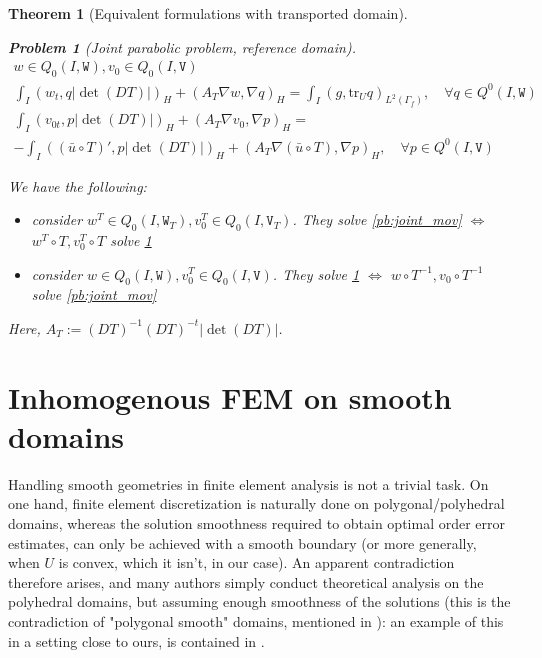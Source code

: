 \documentclass[english,a4paper,9pt,oneside]{scrbook}	%
\theoremstyle{break}
\newtheorem{thm}[equation]{Theorem}
\newtheorem{pb}[equation]{Problem}
\theoremstyle{remark}
\newcommand{\tr}{\text{tr}}
\newcommand{\tw}[1]{\texttt{#1}}
\begin{document}
\begin{appendices}
\begin{thm}[Equivalent formulations with transported domain]
\begin{pb}[Joint parabolic problem, reference domain]
\label{pb:joint_ref}
\begin{align*}
w \in Q_0(I, \tw{W}), v_0 \in Q_0(I,\tw{V}) \\
\int_I ( w_t , q |\det(DT)|)_H+ (A_T\nabla w, \nabla q)_{H} =\int_I(g,\tr_{U} q)_{L^2(\Gamma_f)}, \quad \forall q \in Q^0(I, \tw{W}) \\
\int_I ( v_{0t},p |\det(DT)|)_H + (A_T \nabla v_0, \nabla p)_{H}=\\ -\int_I((\bar{u}\circ T)',p|\det(DT)|)_{H}+(A_T \nabla (\bar{u} \circ T), \nabla p)_{H}, \quad \forall p \in Q^0(I, \tw{V})
\end{align*}
\end{pb}

We have the following:

\begin{itemize}
	\item consider $w^T \in Q_0(I, \tw{W}_T), v_0^T \in Q_0(I,\tw{V}_T)$. They solve \cref{pb:joint_mov} $\iff$ $w^T\circ T , v_0^T\circ T $ solve \cref{pb:joint_ref}
	\item consider $w \in Q_0(I, \tw{W}), v_0^T \in Q_0(I,\tw{V})$. They solve \cref{pb:joint_ref} $\iff$ $w\circ T^{-1}, v_0\circ T^{-1}$ solve \cref{pb:joint_mov} 

\end{itemize}

Here, $A_T:=  (DT)^{-1}(DT)^{-t}|\det(DT)|$.

\end{thm}

\chapter{Inhomogenous FEM on smooth domains}
\label{chap:inh_fem}
Handling smooth geometries in finite element analysis is not a trivial task. On one hand, finite element discretization is naturally done on polygonal/polyhedral domains, whereas the solution smoothness required to obtain optimal order error estimates, can only be achieved with a smooth boundary (or more generally, when $U$ is convex, which it isn't, in our case). An apparent contradiction therefore arises, and many authors simply conduct theoretical analysis on the polyhedral domains, but assuming enough smoothness of the solutions (this is the contradiction of "polygonal smooth" domains, mentioned in \cite{tiihonen}): an example of this in a setting close to ours, is contained in \cite{paganini}. 


\end{appendices}
\end{document}
